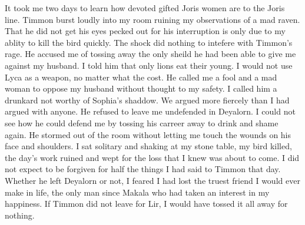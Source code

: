 \documentclass{article}
\begin{document}
\begin{comment}
The Queen's eyes softened a fraction as she realized that I did not intent to play with the life of this child. I may be rumoured to be many unwomanly things, but I was not that type of monster. "I can make no promises, your grace." 

"I understand, your highness. This is a request for your neice as much as it is for me." Her highness left me relieved to have made it through the interview intact. I did not return immediately to my animals. I joined my boys wrestling in the garden, under the noon sun, staining my healer's robes green and brown with grass and mud. I released my day's tensions to the tumble of their laughter and tears as they swung on ropes and bruised their knees. I loved them so much. They were the hope and joy of my days. I had spent the only shred of security I had for them on a man I loved, if impossibly, as much as I loved them. I hoped I had not deprived them of their safety in the future. This was a treacherous game I played. They had not asked to be ensnared in it.

\end{comment}

It took me two days to learn how devoted gifted Joris women are to the Joris line. Timmon burst loudly into my room ruining my observations of a mad raven. That he did not get his eyes pecked out for his interruption is only due to my ablity to kill the bird quickly. The shock did nothing to intefere with Timmon's rage. He accused me of tossing away the only sheild he had been able to give me against my husband. I told him that only lions eat their young. I would not use Lyca as a weapon, no matter what the cost. He called me a fool and a mad woman to oppose my husband without thought to my safety. I called him a drunkard not worthy of Sophia's shaddow. We argued more fiercely than I had argued with anyone. He refused to leave me undefended in Deyalorn. I could not see how he could defend me by tossing his carreer away to drink and shame again. He stormed out of the room without letting me touch the wounds on his face and shoulders. I sat solitary and  shaking at my stone table, my bird killed, the day's work ruined and wept for the loss that I knew was about to come. I did not expect to be forgiven for half the things I had said to Timmon that day. Whether he left Deyalorn or not, I feared I had lost the truest friend I would ever make in life, the only man since Makala who had taken an interest in my happiness. If Timmon did not leave for Lir, I would have tossed it all away for nothing. 
\end{document}
